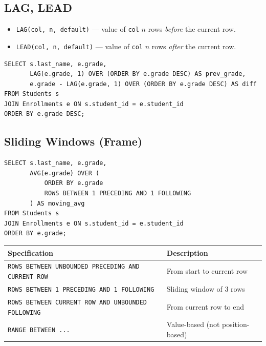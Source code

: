 \subsection{LAG, LEAD}

\begin{definition}
\begin{itemize}
    \item \texttt{LAG(col, n, default)} --- value of \texttt{col} $n$ rows
          \emph{before} the current row.
    \item \texttt{LEAD(col, n, default)} --- value of \texttt{col} $n$ rows
          \emph{after} the current row.
\end{itemize}
\end{definition}

\begin{codeblock}[title=\textbf{Comparing with the Previous Row}]
\begin{verbatim}
SELECT s.last_name, e.grade,
       LAG(e.grade, 1) OVER (ORDER BY e.grade DESC) AS prev_grade,
       e.grade - LAG(e.grade, 1) OVER (ORDER BY e.grade DESC) AS diff
FROM Students s
JOIN Enrollments e ON s.student_id = e.student_id
ORDER BY e.grade DESC;
\end{verbatim}
\end{codeblock}

\subsection{Sliding Windows (Frame)}

\begin{codeblock}[title=\textbf{Moving Average over 3 Rows}]
\begin{verbatim}
SELECT s.last_name, e.grade,
       AVG(e.grade) OVER (
           ORDER BY e.grade
           ROWS BETWEEN 1 PRECEDING AND 1 FOLLOWING
       ) AS moving_avg
FROM Students s
JOIN Enrollments e ON s.student_id = e.student_id
ORDER BY e.grade;
\end{verbatim}
\end{codeblock}

\begin{keyformulas}[title=\textbf{Window Frame Specifications}]
\begin{center}
\begin{tabular}{ll}
\toprule
\textbf{Specification} & \textbf{Description} \\
\midrule
\texttt{ROWS BETWEEN UNBOUNDED PRECEDING AND CURRENT ROW} & From start to current row \\
\texttt{ROWS BETWEEN 1 PRECEDING AND 1 FOLLOWING} & Sliding window of 3 rows \\
\texttt{ROWS BETWEEN CURRENT ROW AND UNBOUNDED FOLLOWING} & From current row to end \\
\texttt{RANGE BETWEEN ...} & Value-based (not position-based) \\
\bottomrule
\end{tabular}
\end{center}
\end{keyformulas}

